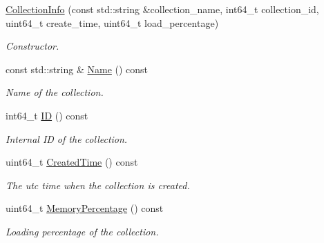 \begin{DoxyCompactItemize}
\item 
\mbox{\label{classmilvus_1_1_collection_info_a95f99f43e901b1b3cd503b7301a5f1d7}} 
\hyperlink{classmilvus_1_1_collection_info_a95f99f43e901b1b3cd503b7301a5f1d7}{Collection\+Info} (const std\+::string \&collection\+\_\+name, int64\+\_\+t collection\+\_\+id, uint64\+\_\+t create\+\_\+time, uint64\+\_\+t load\+\_\+percentage)
\begin{DoxyCompactList}\small\item\em Constructor. \end{DoxyCompactList}\item 
\mbox{\label{classmilvus_1_1_collection_info_ac32c7342e63e4f4ecaf3e66b819d68dc}} 
const std\+::string \& \hyperlink{classmilvus_1_1_collection_info_ac32c7342e63e4f4ecaf3e66b819d68dc}{Name} () const
\begin{DoxyCompactList}\small\item\em Name of the collection. \end{DoxyCompactList}\item 
\mbox{\label{classmilvus_1_1_collection_info_a71efb911e988eaec9b17683dea28f306}} 
int64\+\_\+t \hyperlink{classmilvus_1_1_collection_info_a71efb911e988eaec9b17683dea28f306}{ID} () const
\begin{DoxyCompactList}\small\item\em Internal ID of the collection. \end{DoxyCompactList}\item 
\mbox{\label{classmilvus_1_1_collection_info_ae4575d2fa6fa9d49590072b967cc6a48}} 
uint64\+\_\+t \hyperlink{classmilvus_1_1_collection_info_ae4575d2fa6fa9d49590072b967cc6a48}{Created\+Time} () const
\begin{DoxyCompactList}\small\item\em The utc time when the collection is created. \end{DoxyCompactList}\item 
\mbox{\label{classmilvus_1_1_collection_info_a8f27c2eafdc9f930d4a0d2eb381fb3ef}} 
uint64\+\_\+t \hyperlink{classmilvus_1_1_collection_info_a8f27c2eafdc9f930d4a0d2eb381fb3ef}{Memory\+Percentage} () const
\begin{DoxyCompactList}\small\item\em Loading percentage of the collection. \end{DoxyCompactList}\end{DoxyCompactItemize}


